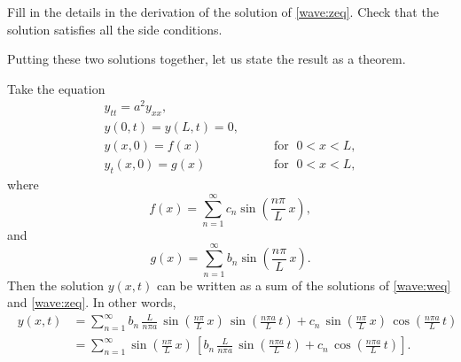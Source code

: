 \begin{exercise}
Fill in the details in the derivation of the solution of \eqref{wave:zeq}.
Check that the solution satisfies all the side conditions.
\end{exercise}

Putting these two solutions together, let us state the result as a theorem.
\begin{theorem}
Take the equation
\begin{equation} \label{wave:tyeq}
\begin{array}{ll}
y_{tt} = a^2 y_{xx} , &  \\
y(0,t) = y(L,t) = 0 , &  \\
y(x,0) = f(x) & \qquad \text{for } \; 0 < x < L , \\
y_t(x,0) = g(x) & \qquad \text{for } \; 0 < x < L ,
\end{array}
\end{equation}
where
\begin{equation*}
f(x) =
\sum_{n=1}^\infty c_n \sin \left( \frac{n \pi}{L} \, x \right) ,
\end{equation*}
and
\begin{equation*}
g(x) =
\sum_{n=1}^\infty b_n \sin \left( \frac{n \pi}{L} \, x \right) .
\end{equation*}
Then the solution $y(x,t)$ can be written as a sum of the solutions
of \eqref{wave:weq} and \eqref{wave:zeq}.  In other words,
\begin{equation*}
\boxed{~~
\begin{aligned}
y(x,t)
& =
\sum_{n=1}^\infty
b_n \,
\frac{L}{n \pi a} \,
\sin \left( \frac{n \pi}{L} \, x \right) \,
\sin \left( \frac{n \pi a}{L} \, t \right) 
+
c_n \,
\sin \left( \frac{n \pi}{L} \, x \right) \,
\cos \left( \frac{n \pi a}{L} \, t \right) 
\\
& =
\sum_{n=1}^\infty
\sin \left( \frac{n \pi}{L} \, x \right) \,
\left[
b_n \,
\frac{L}{n \pi a} \,
\sin \left( \frac{n \pi a}{L} \, t \right) 
+
c_n \,
\cos \left( \frac{n \pi a}{L} \, t \right) 
\right] .
\end{aligned}
~~}
\end{equation*}
\end{theorem}

